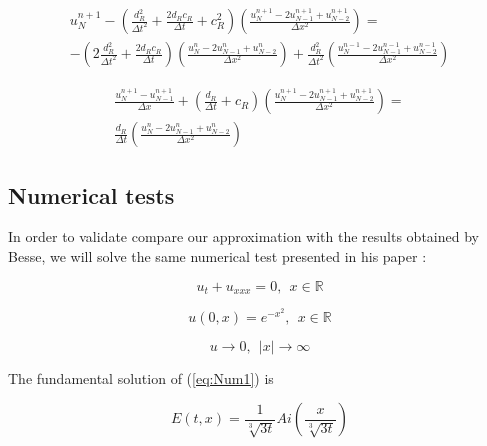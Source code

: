 \begin{equation}
	\begin{split}
    u_N^{n+1} - \left( \frac{d_R^2}{\Delta t^2} + \frac{2d_Rc_R}{\Delta t} + c_R^2  \right) \left(  \frac{u_{N}^{n+1} - 2u_{N-1}^{n+1} + u_{N-2}^{n+1}}{\Delta x^2} \right) =\\
     -\left( 2\frac{d_R^2}{\Delta t^2} + \frac{2d_Rc_R}{\Delta t}\right) \left(  \frac{u_N^{n} - 2u_{N-1}^n + u_{N-2}^{n}}{\Delta x^2} \right) + \frac{d_R^2}{\Delta t^2} \left(  \frac{u_N^{n-1} - 2u_{N-1}^{n-1} + u_{N-2}^{n-1}}{\Delta x^2} \right)
    \end{split}
\end{equation} 
   
\begin{equation}
	\begin{split}	
    \frac{u_N^{n+1} - u_{N-1}^{n+1}}{\Delta x} + \left( \frac{d_R}{\Delta t} + c_R \right) \left( \frac{u_N^{n+1} -2 u_{N-1}^{n+1} + u_{N-2}^{n+1}}{\Delta x^2}\right) = \\
      \frac{d_R}{\Delta t}\left( \frac{u_{N}^{n} - 2u_{N-1}^{n} + u_{N-2}^n}{\Delta x^2}\right)
    \end{split}
\end{equation}


\subsection{Numerical tests}

\indent In order to validate compare our approximation with the results obtained by Besse, we will solve the same numerical test presented in his paper : 

\begin{equation}
\label{eq:Num1}
 u_t + u_{xxx} = 0, \ \ x \in \mathbb{R}
\end{equation}

\begin{equation}
\label{eq:Num2}
 u(0,x) = e^{-x^2}, \ \ x \in \mathbb{R} 
\end{equation}

\begin{equation}
\label{eq:Num3}
 u \rightarrow 0, \ \ |x| \rightarrow \infty
\end{equation}

\indent The fundamental solution of (\ref{eq:Num1}) is

\begin{equation}
    E(t,x) = \frac{1}{\sqrt[3]{3t}}Ai\left(\frac{x}{\sqrt[3]{3t}} \right)
\end{equation}

